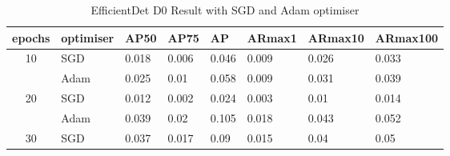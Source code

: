 \documentclass{article}
\begin{document}
\begin{table}
\centering
\setlength{\extrarowheight}{0pt}
\addtolength{\extrarowheight}{\aboverulesep}
\addtolength{\extrarowheight}{\belowrulesep}
\setlength{\aboverulesep}{0pt}
\setlength{\belowrulesep}{0pt}
\captionsetup{labelformat=empty}
\caption{EfficientDet D0 Result with SGD and Adam optimiser}
\begin{tabular}{cl|llllll} 
\toprule
\multicolumn{1}{l}{epochs} & optimiser                               & AP50                                      & AP75                                      & AP                                        & ARmax1                                    & ARmax10                                   & ARmax100                                   \\ 
\hline
\multirow{2}{*}{10}        & {\cellcolor[rgb]{0.788,0.788,0.788}}SGD & {\cellcolor[rgb]{0.788,0.788,0.788}}0.018 & {\cellcolor[rgb]{0.788,0.788,0.788}}0.006 & {\cellcolor[rgb]{0.788,0.788,0.788}}0.046 & {\cellcolor[rgb]{0.788,0.788,0.788}}0.009 & {\cellcolor[rgb]{0.788,0.788,0.788}}0.026 & {\cellcolor[rgb]{0.788,0.788,0.788}}0.033  \\
                           & Adam                                    & 0.025                                     & 0.01                                      & 0.058                                     & 0.009                                     & 0.031                                     & 0.039                                      \\
\multirow{2}{*}{20}        & {\cellcolor[rgb]{0.788,0.788,0.788}}SGD & {\cellcolor[rgb]{0.788,0.788,0.788}}0.012 & {\cellcolor[rgb]{0.788,0.788,0.788}}0.002 & {\cellcolor[rgb]{0.788,0.788,0.788}}0.024 & {\cellcolor[rgb]{0.788,0.788,0.788}}0.003 & {\cellcolor[rgb]{0.788,0.788,0.788}}0.01  & {\cellcolor[rgb]{0.788,0.788,0.788}}0.014  \\
                           & Adam                                    & 0.039                                     & 0.02                                      & 0.105                                     & 0.018                                     & 0.043                                     & 0.052                                      \\
\multirow{2}{*}{30}        & {\cellcolor[rgb]{0.788,0.788,0.788}}SGD & {\cellcolor[rgb]{0.788,0.788,0.788}}0.037 & {\cellcolor[rgb]{0.788,0.788,0.788}}0.017 & {\cellcolor[rgb]{0.788,0.788,0.788}}0.09  & {\cellcolor[rgb]{0.788,0.788,0.788}}0.015 & {\cellcolor[rgb]{0.788,0.788,0.788}}0.04  & {\cellcolor[rgb]{0.788,0.788,0.788}}0.05   \\

\end{tabular}
\end{table}
\end{document}
